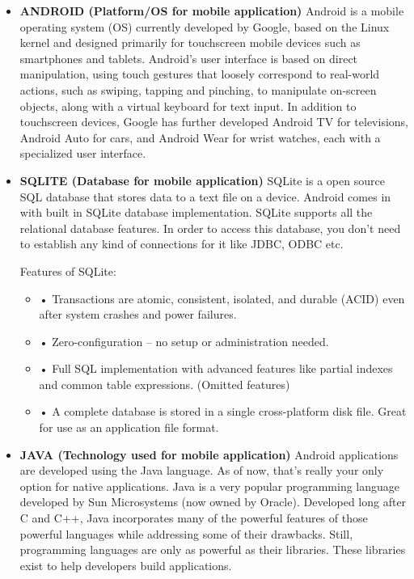 \begin{itemize}
\item	\textbf{ANDROID (Platform/OS  for mobile application) }
Android is a mobile operating system (OS) currently developed by Google, based on the Linux kernel and designed primarily for touchscreen mobile devices such as smartphones and tablets. Android’s user interface is based on direct manipulation, using touch gestures that loosely correspond to real-world actions, such as swiping, tapping and pinching, to manipulate on-screen objects, along with a virtual keyboard for text input. In addition to touchscreen devices, Google has further developed Android TV for televisions, Android Auto for cars, and Android Wear for wrist watches, each with a specialized user interface.

\item	\textbf{SQLITE (Database for mobile application) }
SQLite is a open source SQL database that stores data to a text file on a device. Android comes in with built in SQLite database implementation. SQLite supports all the relational database features. In order to access this database, you don’t need to establish any kind of connections for it like JDBC, ODBC etc.

Features of SQLite:
\begin{itemize}
\item	•	Transactions are atomic, consistent, isolated, and durable (ACID) even after system crashes and power failures.

\item •	Zero-configuration – no setup or administration needed.

\item •	Full SQL implementation with advanced features like partial indexes and common table expressions. (Omitted features)

\item	•	A complete database is stored in a single cross-platform disk file. Great for use as an application file format.
\end{itemize}

\item	\textbf{JAVA (Technology used for mobile application) }
Android applications are developed using the Java language. As of now, that’s really your only option for native applications. Java is a very popular programming language developed by Sun Microsystems (now owned by Oracle). Developed long after C and C++, Java incorporates many of the powerful features of those powerful languages while addressing some of their drawbacks. Still, programming languages are only as powerful as their libraries. These libraries exist to help developers build applications.


\end{itemize}
